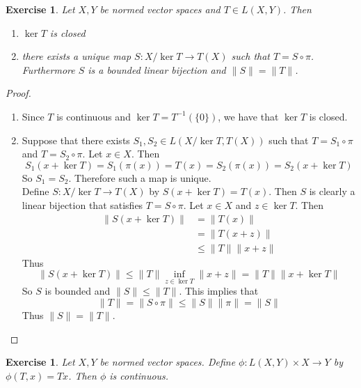 \documentclass[12pt]{amsart}
\newtheorem{ex}[thm]{Exercise}
\begin{document}
	\begin{ex}
		Let $X,Y$ be normed vector spaces and $T \in L(X,Y)$. Then
		\begin{enumerate}
			\item $\ker T$ is closed
			\item there exists a unique map $S :X/ \ker T \rightarrow T(X)$ such that $T = S \circ \pi$. Furthermore $S$ is a bounded linear bijection and $\|S \|= \|T \|$.
		\end{enumerate}
	\end{ex}
	
	\begin{proof}
		\begin{enumerate}
			\item Since $T$ is continuous and $\ker T = T^{-1}(\{0\})$, we have that $\ker T$ is closed.
			\item Suppose that there exists $S_1,S_2 \in L(X/ \ker T, T(X)) $ such that $T = S_1 \circ \pi$ and  $T = S_2 \circ \pi $. Let $x \in X$. Then $$S_1(x + \ker T) = S_1(\pi(x)) = T(x) = S_2(\pi(x)) = S_2(x + \ker T)$$ So $S_1 = S_2$. Therefore such a map is unique.\\
			Define $S: X / \ker T \rightarrow T(X)$ by $S(x+ \ker T) = T(x)$. Then $S$ is clearly a linear bijection that satisfies $T = S \circ \pi$. Let $x \in X$ and $z \in \ker T$. Then 
			\begin{align*}
				\|S(x+ \ker T) \|
				& = \|T(x) \|\\
				& = \|T(x+z) \|\\
				& \leq \|T \|\|x+ z \|
			\end{align*} 
			Thus $$\|S(x+ \ker T) \|\leq \|T \|\inf_{z \in \ker T}  \|x + z \|= \|T \|\|x + \ker T \|$$
			So $S$ is bounded and $\|S \|\leq \|T \|$. This implies that $$\|T \|= \|S \circ \pi \|\leq \|S \|\|\pi \|= \|S \|$$
			Thus $\|S \|= \|T \|$.
		\end{enumerate}
	\end{proof}
	
	\begin{ex}
		Let $X, Y$ be normed vector spaces. Define $\phi: L(X,Y) \times X \rightarrow Y$ by \\$\phi(T,x) = Tx$. Then $\phi$ is continuous.
	\end{ex}
	
\end{document}
